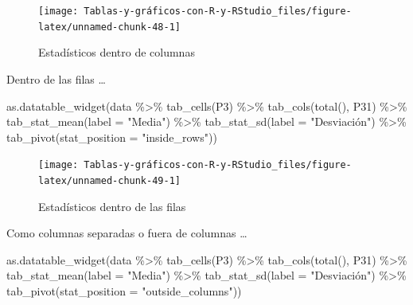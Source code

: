 \documentclass[
]{book}
\newenvironment{Shaded}{\begin{snugshade}}{\end{snugshade}}
\newcommand{\AttributeTok}[1]{\textcolor[rgb]{0.77,0.63,0.00}{#1}}
\newcommand{\FunctionTok}[1]{\textcolor[rgb]{0.00,0.00,0.00}{#1}}
\newcommand{\NormalTok}[1]{#1}
\newcommand{\SpecialCharTok}[1]{\textcolor[rgb]{0.00,0.00,0.00}{#1}}
\newcommand{\StringTok}[1]{\textcolor[rgb]{0.31,0.60,0.02}{#1}}
\begin{document}
\begin{figure}[H]

{\centering \texttt{[image: Tablas-y-gráficos-con-R-y-RStudio\_files/figure-latex/unnamed-chunk-48-1]} 

}

\caption{Estadísticos dentro de columnas}\label{fig:unnamed-chunk-48}
\end{figure}

Dentro de las filas \ldots{}

\begin{Shaded}
\begin{Highlighting}[]
\FunctionTok{as.datatable\_widget}\NormalTok{(data }\SpecialCharTok{\%\textgreater{}\%} \FunctionTok{tab\_cells}\NormalTok{(P3) }\SpecialCharTok{\%\textgreater{}\%} \FunctionTok{tab\_cols}\NormalTok{(}\FunctionTok{total}\NormalTok{(), }
\NormalTok{  P31) }\SpecialCharTok{\%\textgreater{}\%} \FunctionTok{tab\_stat\_mean}\NormalTok{(}\AttributeTok{label =} \StringTok{"Media"}\NormalTok{) }\SpecialCharTok{\%\textgreater{}\%} \FunctionTok{tab\_stat\_sd}\NormalTok{(}\AttributeTok{label =} \StringTok{"Desviación"}\NormalTok{) }\SpecialCharTok{\%\textgreater{}\%} 
  \FunctionTok{tab\_pivot}\NormalTok{(}\AttributeTok{stat\_position =} \StringTok{"inside\_rows"}\NormalTok{))}
\end{Highlighting}
\end{Shaded}

\begin{figure}[H]

{\centering \texttt{[image: Tablas-y-gráficos-con-R-y-RStudio\_files/figure-latex/unnamed-chunk-49-1]} 

}

\caption{Estadísticos dentro de las filas}\label{fig:unnamed-chunk-49}
\end{figure}

Como columnas separadas o fuera de columnas \ldots{}

\begin{Shaded}
\begin{Highlighting}[]
\FunctionTok{as.datatable\_widget}\NormalTok{(data }\SpecialCharTok{\%\textgreater{}\%} \FunctionTok{tab\_cells}\NormalTok{(P3) }\SpecialCharTok{\%\textgreater{}\%} \FunctionTok{tab\_cols}\NormalTok{(}\FunctionTok{total}\NormalTok{(), }
\NormalTok{  P31) }\SpecialCharTok{\%\textgreater{}\%} \FunctionTok{tab\_stat\_mean}\NormalTok{(}\AttributeTok{label =} \StringTok{"Media"}\NormalTok{) }\SpecialCharTok{\%\textgreater{}\%} \FunctionTok{tab\_stat\_sd}\NormalTok{(}\AttributeTok{label =} \StringTok{"Desviación"}\NormalTok{) }\SpecialCharTok{\%\textgreater{}\%} 
  \FunctionTok{tab\_pivot}\NormalTok{(}\AttributeTok{stat\_position =} \StringTok{"outside\_columns"}\NormalTok{))}
\end{Highlighting}
\end{Shaded}
\end{document}
